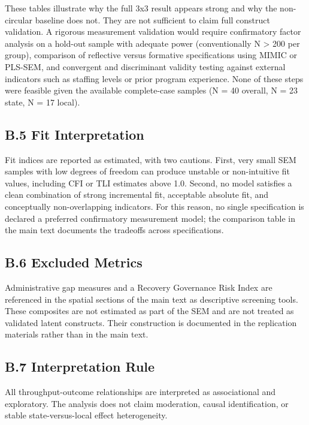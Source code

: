 \documentclass[
  number]{elsarticle}
\begin{document}
These tables illustrate why the full 3x3 result appears strong and why
the non-circular baseline does not. They are not sufficient to claim
full construct validation. A rigorous measurement validation would
require confirmatory factor analysis on a hold-out sample with adequate
power (conventionally N \textgreater{} 200 per group), comparison of
reflective versus formative specifications using MIMIC or PLS-SEM, and
convergent and discriminant validity testing against external indicators
such as staffing levels or prior program experience. None of these steps
were feasible given the available complete-case samples (N = 40 overall,
N = 23 state, N = 17 local).

\subsection{B.5 Fit Interpretation}\label{b.5-fit-interpretation}

Fit indices are reported as estimated, with two cautions. First, very
small SEM samples with low degrees of freedom can produce unstable or
non-intuitive fit values, including CFI or TLI estimates above 1.0.
Second, no model satisfies a clean combination of strong incremental
fit, acceptable absolute fit, and conceptually non-overlapping
indicators. For this reason, no single specification is declared a
preferred confirmatory measurement model; the comparison table in the
main text documents the tradeoffs across specifications.

\subsection{B.6 Excluded Metrics}\label{b.6-excluded-metrics}

Administrative gap measures and a Recovery Governance Risk Index are
referenced in the spatial sections of the main text as descriptive
screening tools. These composites are not estimated as part of the SEM
and are not treated as validated latent constructs. Their construction
is documented in the replication materials rather than in the main text.

\subsection{B.7 Interpretation Rule}\label{b.7-interpretation-rule}

All throughput-outcome relationships are interpreted as associational
and exploratory. The analysis does not claim moderation, causal
identification, or stable state-versus-local effect heterogeneity.
\end{document}
